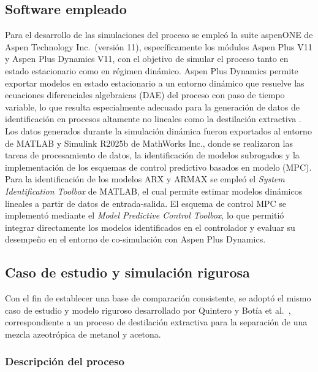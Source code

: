 \subsection{Software empleado}

Para el desarrollo de las simulaciones del proceso se empleó la suite
aspenONE\textregistered{} de Aspen Technology Inc.\ (versión 11), específicamente los
módulos Aspen Plus V11 y Aspen Plus Dynamics V11, con el objetivo de simular el proceso tanto en estado estacionario como en régimen dinámico. Aspen Plus Dynamics permite exportar modelos en estado estacionario a un entorno dinámico que resuelve las ecuaciones diferenciales algebraicas (DAE) del proceso con paso de tiempo variable, lo que resulta especialmente adecuado para la generación de datos de identificación en procesos altamente no lineales como la destilación extractiva \cite{ref10}. Los datos generados durante la simulación dinámica fueron exportados al entorno de MATLAB\textregistered{} y Simulink\textregistered{} R2025b de MathWorks Inc., donde se realizaron las tareas de procesamiento de datos, la identificación de modelos subrogados y la implementación de los esquemas de control predictivo basados en modelo (MPC). Para la identificación de los modelos ARX y ARMAX se empleó el \textit{System Identification Toolbox} de MATLAB\textregistered{}, el cual permite estimar modelos dinámicos lineales a partir de datos de entrada-salida. El esquema de control MPC se implementó mediante el \textit{Model Predictive Control Toolbox}, lo que permitió integrar directamente los modelos identificados en el controlador y evaluar su desempeño en el entorno de co-simulación con Aspen Plus Dynamics.

\subsection{Caso de estudio y simulación rigurosa}

Con el fin de establecer una base de comparación consistente, se adoptó el mismo caso de estudio y modelo riguroso desarrollado por Quintero y Botía et al.\ \cite{ref10}, correspondiente a un proceso de destilación extractiva para la separación de una mezcla azeotrópica de metanol y acetona.

\subsubsection{Descripción del proceso}

